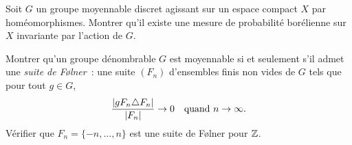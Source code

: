 \begin{exercice}
Soit $G$ un groupe moyennable discret agissant sur un espace compact $X$ par
hom\'eomorphismes. Montrer qu'il existe une mesure de probabilit\'e bor\'elienne sur $X$
invariante par l'action de $G$.
\end{exercice}

\begin{exercice}
Montrer qu'un groupe d\'enombrable $G$ est moyennable si et seulement s'il admet une
\emph{suite de F\o lner}~: une suite $(F_n)$ d'ensembles finis non vides de $G$ tels que
pour tout $g \in G$,
\[
  \frac{\left| gF_n \triangle F_n \right|}{\left| F_n \right|} \to 0 \quad \text{quand } n \to \infty.
\]
V\'erifier que $F_n = \{-n, \ldots, n\}$ est une suite de F\o lner pour $\mathbb{Z}$.
\end{exercice}
